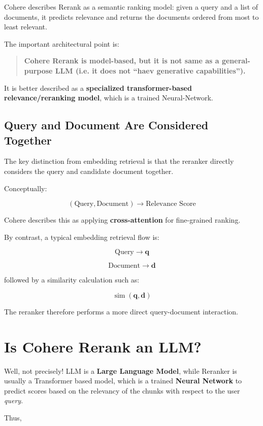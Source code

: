 \documentclass[12pt, a4paper]{article}
\begin{document}
Cohere describes Rerank as a semantic ranking model: given a query and a list of documents, it predicts relevance and returns the documents ordered from most to least relevant.

The important architectural point is:

\begin{quote}
\textbf{Cohere Rerank is model-based, but it is not same as a general-purpose LLM (i.e. it does not ``haev generative capabilities'').}
\end{quote}

It is better described as a \textbf{specialized transformer-based relevance/reranking model}, which is a trained Neural-Network.

\subsection{Query and Document Are Considered Together}

The key distinction from embedding retrieval is that the reranker directly considers the query and candidate document together.

Conceptually:

\[
(\text{Query},\text{Document}) \longrightarrow \text{Relevance Score}
\]

Cohere describes this as applying \textbf{cross-attention} for fine-grained ranking.

By contrast, a typical embedding retrieval flow is:

\[
\text{Query} \longrightarrow \mathbf{q}
\]

\[
\text{Document} \longrightarrow \mathbf{d}
\]

followed by a similarity calculation such as:

\[
\operatorname{sim}(\mathbf{q},\mathbf{d})
\]

The reranker therefore performs a more direct query-document interaction.

\section{Is Cohere Rerank an LLM?}

Well, not precisely! LLM is a \textbf{Large Language Model}, while Reranker is usually a Transformer based model, which is a trained \textbf{Neural Network} to predict scores based on the relevancy of the chunks with respect to the user \textit{query}. 

Thus,
\end{document}

